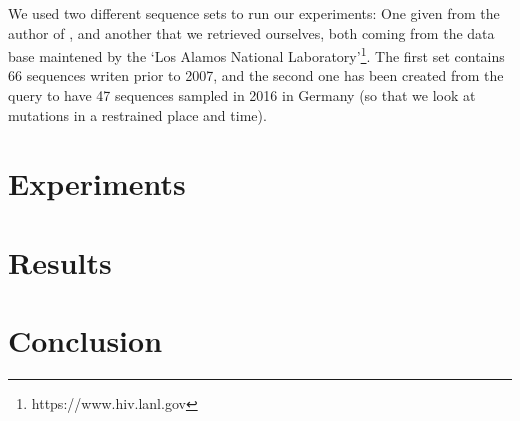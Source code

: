 \documentclass[english,13pt,a4paper]{article}
\theoremstyle{definition}
\theoremstyle{remark}
\begin{document}
We used two different sequence sets to run our experiments: One given from the author of \cite{didier_comparing_2007}, and another that we retrieved ourselves, both coming from the data base maintened by the `Los Alamos National Laboratory'\footnote{https://www.hiv.lanl.gov}. The first set contains 66 sequences writen prior to 2007, and the second one has been created from the query to have 47 sequences sampled in 2016 in Germany (so that we look at mutations in a restrained place and time).


\section{Experiments}

 



\section{Results}


\section{Conclusion}



\newpage
{}
\printbibliography
\end{document}
